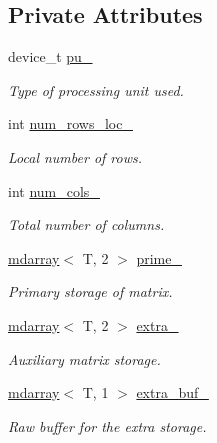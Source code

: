 \subsection*{Private Attributes}
\begin{DoxyCompactItemize}
\item 
device\+\_\+t \hyperlink{classsddk_1_1matrix__storage_3_01_t_00_01matrix__storage__t_1_1slab_01_4_a9e03c4fc4eb8e8d4a49983dddba39014}{pu\+\_\+}
\begin{DoxyCompactList}\small\item\em Type of processing unit used. \end{DoxyCompactList}\item 
int \hyperlink{classsddk_1_1matrix__storage_3_01_t_00_01matrix__storage__t_1_1slab_01_4_aed403722d47dae87a9a721b94c8a3ead}{num\+\_\+rows\+\_\+loc\+\_\+}
\begin{DoxyCompactList}\small\item\em Local number of rows. \end{DoxyCompactList}\item 
int \hyperlink{classsddk_1_1matrix__storage_3_01_t_00_01matrix__storage__t_1_1slab_01_4_aea07eddfd0f46bb0649933617389a2d1}{num\+\_\+cols\+\_\+}
\begin{DoxyCompactList}\small\item\em Total number of columns. \end{DoxyCompactList}\item 
\hyperlink{classsddk_1_1mdarray}{mdarray}$<$ T, 2 $>$ \hyperlink{classsddk_1_1matrix__storage_3_01_t_00_01matrix__storage__t_1_1slab_01_4_a36fd50a540cca9842230ae29ba05b8bc}{prime\+\_\+}
\begin{DoxyCompactList}\small\item\em Primary storage of matrix. \end{DoxyCompactList}\item 
\hyperlink{classsddk_1_1mdarray}{mdarray}$<$ T, 2 $>$ \hyperlink{classsddk_1_1matrix__storage_3_01_t_00_01matrix__storage__t_1_1slab_01_4_abf951b4fd1c7be54bbb5e01876db40b5}{extra\+\_\+}
\begin{DoxyCompactList}\small\item\em Auxiliary matrix storage. \end{DoxyCompactList}\item 
\hyperlink{classsddk_1_1mdarray}{mdarray}$<$ T, 1 $>$ \hyperlink{classsddk_1_1matrix__storage_3_01_t_00_01matrix__storage__t_1_1slab_01_4_afe3cc19ad8eb86b00642e4a72d355176}{extra\+\_\+buf\+\_\+}
\begin{DoxyCompactList}\small\item\em Raw buffer for the extra storage. \end{DoxyCompactList}\item 

\end{DoxyCompactItemize}
